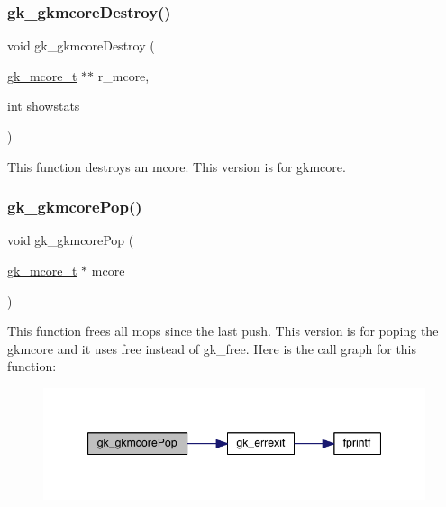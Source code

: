 \subsubsection{\texorpdfstring{gk\+\_\+gkmcore\+Destroy()}{gk\_gkmcoreDestroy()}}
{\footnotesize\ttfamily void gk\+\_\+gkmcore\+Destroy (\begin{DoxyParamCaption}\item[{\hyperlink{a00682}{gk\+\_\+mcore\+\_\+t} $\ast$$\ast$}]{r\+\_\+mcore,  }\item[{int}]{showstats }\end{DoxyParamCaption})}

This function destroys an mcore. This version is for gkmcore. \mbox{\label{a00077_ad8c9738b8a6a34af2aa8f271fe14cfa9}} 
\subsubsection{\texorpdfstring{gk\+\_\+gkmcore\+Pop()}{gk\_gkmcorePop()}}
{\footnotesize\ttfamily void gk\+\_\+gkmcore\+Pop (\begin{DoxyParamCaption}\item[{\hyperlink{a00682}{gk\+\_\+mcore\+\_\+t} $\ast$}]{mcore }\end{DoxyParamCaption})}

This function frees all mops since the last push. This version is for poping the gkmcore and it uses free instead of gk\+\_\+free. Here is the call graph for this function\+:\nopagebreak
\begin{figure}[H]
\begin{center}
\leavevmode
\includegraphics[width=344pt]{a00077_ad8c9738b8a6a34af2aa8f271fe14cfa9_cgraph}
\end{center}
\end{figure}
\mbox{\label{a00077_a7e52f5d61f36e5c6a9e6634d90dadf2d}} 

